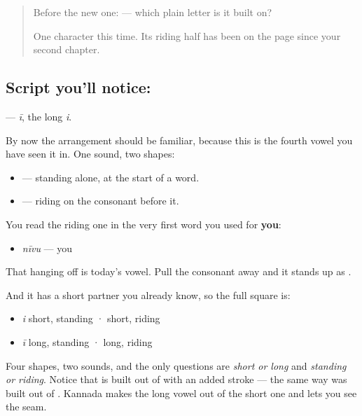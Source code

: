 \label{lesson:KA-S130-letter-ii}



\begin{quote}
Before the new one:  — which plain letter is it built on?

One character this time. Its riding half has been on the page since your second chapter.
\end{quote}

\subsection*{Script you'll notice: }
\textbf{} — \emph{ī}, the long \emph{i}.

By now the arrangement should be familiar, because this is the fourth vowel you have seen it in. One sound, two shapes:

\begin{itemize}
\raggedright
  \item \textbf{} — standing alone, at the start of a word.
  \item \textbf{} — riding on the consonant before it.
\end{itemize}

You read the riding one in the very first word you used for \textbf{you}:

\begin{itemize}
\raggedright
  \item \textbf{} \emph{nīvu} — you
\end{itemize}

That \textbf{} hanging off \textbf{} is today's vowel. Pull the consonant away and it stands up as \textbf{}.

And it has a short partner you already know, so the full square is:

\begin{itemize}
\raggedright
  \item \textbf{} \emph{i} short, standing · \textbf{} short, riding
  \item \textbf{} \emph{ī} long, standing · \textbf{} long, riding
\end{itemize}

Four shapes, two sounds, and the only questions are \emph{short or long} and \emph{standing or riding}. Notice that \textbf{} is built out of \textbf{} with an added stroke — the same way \textbf{} was built out of \textbf{}. Kannada makes the long vowel out of the short one and lets you see the seam.

